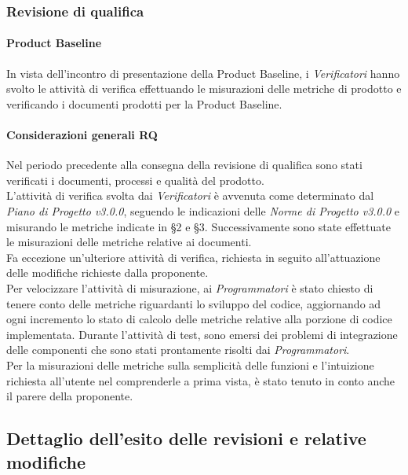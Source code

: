 	\subsubsection{Revisione di qualifica}
	\paragraph{Product Baseline}
	In vista dell'incontro di presentazione della Product Baseline\glo, i \textit{Verificatori} hanno svolto le attività di verifica effettuando le misurazioni delle metriche di prodotto e verificando i documenti prodotti per la Product Baseline.
	
			
	\paragraph{Considerazioni generali RQ}
	Nel periodo precedente alla consegna della revisione di qualifica sono stati verificati i documenti, processi e qualità del prodotto. \\
	L'attività di verifica svolta dai \textit{Verificatori} è avvenuta come determinato dal \textit{Piano di Progetto v3.0.0}, seguendo le indicazioni delle \textit{Norme di Progetto v3.0.0} e misurando le metriche indicate in §2 e §3.  Successivamente sono state effettuate le misurazioni delle metriche relative ai documenti. \\
	Fa eccezione un'ulteriore attività di verifica, richiesta in seguito all'attuazione delle modifiche richieste dalla proponente. \\
	Per velocizzare l'attività di misurazione, ai \textit{Programmatori} è stato chiesto di tenere conto delle metriche riguardanti lo sviluppo del codice, aggiornando ad ogni incremento lo stato di calcolo delle metriche relative alla porzione di codice implementata.
	Durante l'attività di test, sono emersi dei problemi di integrazione delle componenti che sono stati prontamente risolti dai \textit{Programmatori}. \\
	Per la misurazioni delle metriche sulla semplicità delle funzioni e l'intuizione richiesta all'utente nel comprenderle a prima vista, è  stato tenuto in conto anche il parere della proponente. 
	\newpage
\subsection{Dettaglio dell'esito delle revisioni e relative modifiche}
